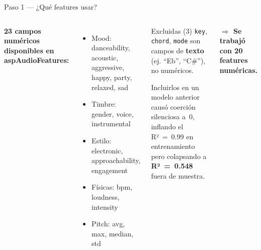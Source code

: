 \documentclass[aspectratio=169]{beamer}
\begin{document}
\begin{frame}{Paso 1 — ¿Qué features usar?}

  \begin{columns}
      \textbf{23 campos numéricos disponibles en aspAudioFeatures:}
      \small
      \begin{itemize}
        \item Mood: danceability, acoustic, aggressive, happy, party, relaxed, sad
        \item Timbre: gender, voice, instrumental
        \item Estilo: electronic, approachability, engagement
        \item Físicas: bpm, loudness, intensity
        \item Pitch: avg, max, median, std
      \end{itemize}

      \begin{alertblock}{\color{aspred}Excluidas (3)}
        \texttt{key}, \texttt{chord}, \texttt{mode} son campos de \textbf{texto} (ej. ``Eb'', ``C\#''), no numéricos.

        \medskip
        Incluirlos en un modelo anterior causó coerción silenciosa a~0, inflando el R²~=~0.99 en entrenamiento pero colapsando a \textbf{R²~=~0.548} fuera de muestra.
      \end{alertblock}

      \bigskip
      \textbf{$\Rightarrow$ Se trabajó con 20 features numéricas.}
  \end{columns}
\end{frame}
\end{document}
